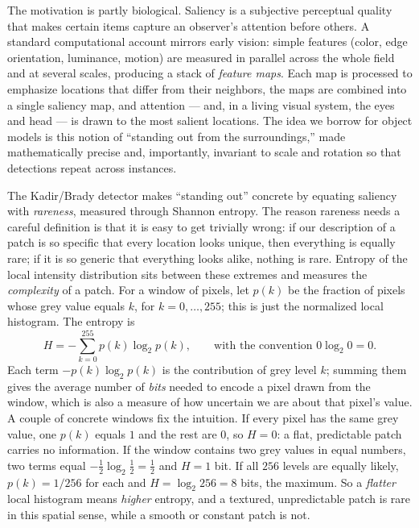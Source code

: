 The motivation is partly biological. Saliency is a subjective perceptual quality
that makes certain items capture an observer's attention before others. A standard
computational account mirrors early vision: simple features (color, edge
orientation, luminance, motion) are measured in parallel across the whole field
and at several scales, producing a stack of \emph{feature maps}. Each map is
processed to emphasize locations that differ from their neighbors, the maps are
combined into a single saliency map, and attention --- and, in a living visual
system, the eyes and head --- is drawn to the most salient locations. The idea we
borrow for object models is this notion of ``standing out from the surroundings,''
made mathematically precise and, importantly, invariant to scale and rotation so
that detections repeat across instances.

The Kadir/Brady detector makes ``standing out'' concrete by equating saliency with
\emph{rareness}, measured through Shannon entropy. The reason rareness needs a
careful definition is that it is easy to get trivially wrong: if our description
of a patch is so specific that every location looks unique, then everything is
equally rare; if it is so generic that everything looks alike, nothing is rare.
Entropy of the local intensity distribution sits between these extremes and
measures the \emph{complexity} of a patch. For a window of pixels, let $p(k)$ be
the fraction of pixels whose grey value equals $k$, for $k = 0,\dots,255$; this
is just the normalized local histogram. The entropy is
\begin{equation}
  H = -\sum_{k=0}^{255} p(k)\log_2 p(k),
  \qquad \text{with the convention } 0\log_2 0 = 0 .
  \label{eq:entropy}
\end{equation}
\noindent
Each term $-p(k)\log_2 p(k)$ is the contribution of grey level $k$; summing them
gives the average number of \emph{bits} needed to encode a pixel drawn from the
window, which is also a measure of how uncertain we are about that pixel's value.
A couple of concrete windows fix the intuition. If every pixel has the same grey
value, one $p(k)$ equals $1$ and the rest are $0$, so $H = 0$: a flat, predictable
patch carries no information. If the window contains two grey values in equal
numbers, two terms equal $-\tfrac12\log_2\tfrac12 = \tfrac12$ and $H = 1$ bit. If
all $256$ levels are equally likely, $p(k) = 1/256$ for each and $H = \log_2 256 =
8$ bits, the maximum. So a \emph{flatter} local histogram means \emph{higher}
entropy, and a textured, unpredictable patch is rare in this spatial sense, while
a smooth or constant patch is not.

